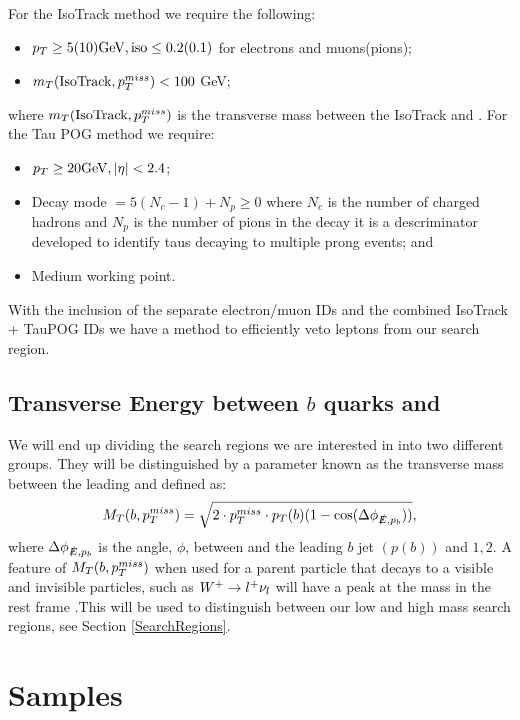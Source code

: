 For the IsoTrack method we require the following:
\begin{itemize}
	\item $p_{T}\geq5(10) \text{GeV}, \text{iso}\leq0.2(0.1)$ for electrons and muons(pions);
	\item $m_T(\text{IsoTrack},p_{T}^{miss})<100$ GeV;
\end{itemize}
where $m_T(\text{IsoTrack},p_{T}^{miss})$ is the transverse mass between the IsoTrack and \met. For the Tau POG method we require:
\begin{itemize}
	\item $p_{T}\geq20 \text{GeV}, |\eta|<2.4$;
	\item Decay mode $=5(N_c-1)+N_p\geq0$ where $N_c$ is the number of charged hadrons and $N_p$ is the number of pions in the decay it is a descriminator developed to identify taus decaying to multiple prong events; and
	\item Medium working point.
\end{itemize}
With the inclusion of the separate electron/muon IDs and the combined IsoTrack + TauPOG IDs we have a method to efficiently veto leptons from our search region.

\subsection{Transverse Energy between $b$ quarks and \met} \label{sec:transverseMass}
We will end up dividing the search regions we are interested in into two different groups. They will be distinguished by a parameter known as the transverse mass between the leading \bjet{} and \met{} defined as:
\begin{equation}\label{TransverseMass}
M_T(b,p_{T}^{miss})=\sqrt{2\cdot p_{T}^{miss}\cdot p_{T}(b)(1-\cos(\Delta\phi_{\slashed{E},p_b}))},
\end{equation}
where $\Delta\phi_{\slashed{E},p_b}$ is the angle, $\phi$, between \met and the leading $b$ jet $(p(b))$ and $1,2$. A feature of $M_T(b,p_{T}^{miss})$ when used for a parent particle that decays to a visible and invisible particles, such as $W^+\rightarrow l^+\nu_l$ will have a peak at the \W{} mass in the rest frame \cite{tovey_transformation_2019}.This will be used to distinguish between our low and high mass search regions, see Section \ref{SearchRegions}.

\section{Samples}\label{Samples}



